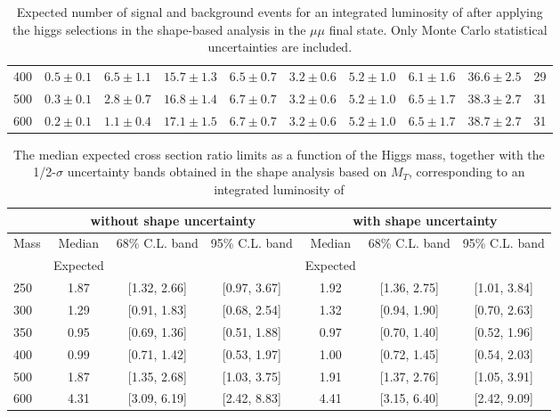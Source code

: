 \begin{table}
{\begin{center}
\begin{tabular}{l | c c |  c c c c c c | c }
400 & $0.5\pm0.1$ & $6.5\pm1.1$ & $15.7\pm1.3$ & $6.5\pm0.7$ & $3.2\pm0.6$ & $5.2\pm1.0$ & $6.1\pm1.6$ & $36.6\pm2.5$ & 29 \\
500 & $0.3\pm0.1$ & $2.8\pm0.7$ & $16.8\pm1.4$ & $6.7\pm0.7$ & $3.2\pm0.6$ & $5.2\pm1.0$ & $6.5\pm1.7$ & $38.3\pm2.7$ & 31 \\
600 & $0.2\pm0.1$ & $1.1\pm0.4$ & $17.1\pm1.5$ & $6.7\pm0.7$ & $3.2\pm0.6$ & $5.2\pm1.0$ & $6.5\pm1.7$ & $38.7\pm2.7$ & 31 \\
\hline
\end{tabular}
\end{center}
}
\caption{Expected number of signal and background events for an 
  integrated luminosity of \intlumi after applying the higgs selections in the shape-based analysis in the $\mu\mu$ final state. 
  Only Monte Carlo statistical uncertainties are included. }
\label{tab:yield_shapebased_mm}
\end{table}

\begin{table}
\begin{center}
{\normalsize
\begin{tabular}{|l|c|c|c|c|c|c|}
\hline
      &  \multicolumn{3}{c|}{ without shape uncertainty} &\multicolumn{3}{c|}{ with shape uncertainty} \\
\hline
Mass  &  Median      &     68\% C.L. band &  95\% C.L. band &  Median	   &	 68\% C.L. band &  95\% C.L. band\\
      &  Expected    &                    &                 &  Expected    &			&		 \\
\hline
250 & 1.87 & [1.32, 2.66] & [0.97, 3.67] & 1.92 & [1.36, 2.75] & [1.01, 3.84] \\
300 & 1.29 & [0.91, 1.83] & [0.68, 2.54] & 1.32 & [0.94, 1.90] & [0.70, 2.63] \\
350 & 0.95 & [0.69, 1.36] & [0.51, 1.88] & 0.97 & [0.70, 1.40] & [0.52, 1.96] \\
400 & 0.99 & [0.71, 1.42] & [0.53, 1.97] & 1.00 & [0.72, 1.45] & [0.54, 2.03] \\
500 & 1.87 & [1.35, 2.68] & [1.03, 3.75] & 1.91 & [1.37, 2.76] & [1.05, 3.91] \\
600 & 4.31 & [3.09, 6.19] & [2.42, 8.83] & 4.41 & [3.15, 6.40] & [2.42, 9.09] \\
\hline
\end{tabular}
}
\end{center}
\caption{The median expected cross section ratio limits as a function 
of the Higgs mass, together with the 1/2-$\sigma$ uncertainty bands obtained in the shape analysis based on $M_T$, corresponding to 
an integrated luminosity of \intlumi}
\label{tab:limits_mtshape_2fb}
\end{table}

